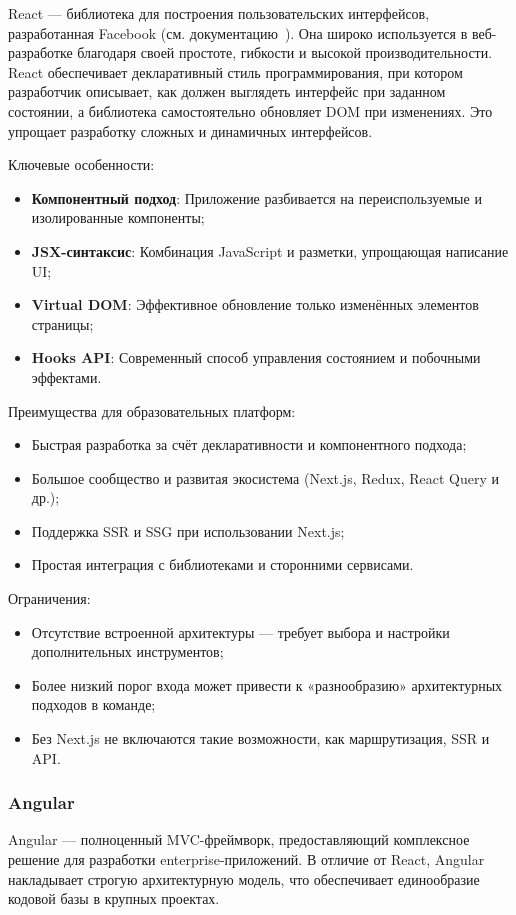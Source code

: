 React — библиотека для построения пользовательских интерфейсов, разработанная Facebook (см. документацию~\cite{2}). Она широко используется в веб-разработке благодаря своей простоте, гибкости и высокой производительности. React обеспечивает декларативный стиль программирования, при котором разработчик описывает, как должен выглядеть интерфейс при заданном состоянии, а библиотека самостоятельно обновляет DOM при изменениях. Это упрощает разработку сложных и динамичных интерфейсов.

Ключевые особенности:
\begin{itemize}
  \item \textbf{Компонентный подход}: Приложение разбивается на переиспользуемые и изолированные компоненты;
  \item \textbf{JSX-синтаксис}: Комбинация JavaScript и разметки, упрощающая написание UI;
  \item \textbf{Virtual DOM}: Эффективное обновление только изменённых элементов страницы;
  \item \textbf{Hooks API}: Современный способ управления состоянием и побочными эффектами.
\end{itemize}

Преимущества для образовательных платформ:
\begin{itemize}
  \item Быстрая разработка за счёт декларативности и компонентного подхода;
  \item Большое сообщество и развитая экосистема (Next.js, Redux, React Query и др.);
  \item Поддержка SSR и SSG при использовании Next.js;
  \item Простая интеграция с библиотеками и сторонними сервисами.
\end{itemize}

Ограничения:
\begin{itemize}
  \item Отсутствие встроенной архитектуры — требует выбора и настройки дополнительных инструментов;
  \item Более низкий порог входа может привести к «разнообразию» архитектурных подходов в команде;
  \item Без Next.js не включаются такие возможности, как маршрутизация, SSR и API.
\end{itemize}

\subsubsection{Angular}
Angular — полноценный MVC-фреймворк, предоставляющий комплексное решение для разработки enterprise-приложений. В отличие от React, Angular накладывает строгую архитектурную модель, что обеспечивает единообразие кодовой базы в крупных проектах.


